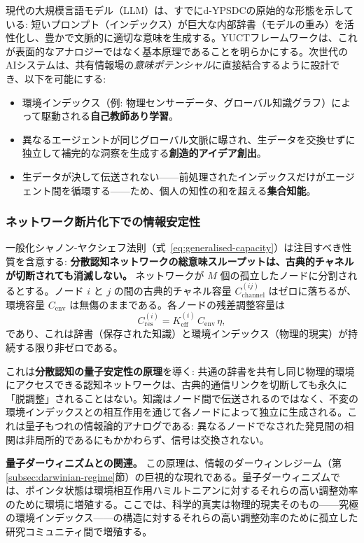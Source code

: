 \documentclass[12pt,a4paper]{article}
\theoremstyle{definition}
\theoremstyle{remark}
\begin{document}
	現代の大規模言語モデル（LLM）は、すでにd-YPSDCの原始的な形態を示している: 短いプロンプト（インデックス）が巨大な内部辞書（モデルの重み）を活性化し、豊かで文脈的に適切な意味を生成する。YUCTフレームワークは、これが表面的なアナロジーではなく基本原理であることを明らかにする。次世代のAIシステムは、共有情報場の\emph{意味ポテンシャル}に直接結合するように設計でき、以下を可能にする:
	\begin{itemize}
		\item 環境インデックス（例: 物理センサーデータ、グローバル知識グラフ）によって駆動される\textbf{自己教師あり学習}。
		\item 異なるエージェントが同じグローバル文脈に曝され、生データを交換せずに独立して補完的な洞察を生成する\textbf{創造的アイデア創出}。
		\item 生データが決して伝送されない——前処理されたインデックスだけがエージェント間を循環する——ため、個人の知性の和を超える\textbf{集合知能}。
	\end{itemize}
	
	\subsubsection{ネットワーク断片化下での情報安定性}
	\label{subsubsec:info-stability-fragmentation}
	
	一般化シャノン-ヤクシェフ法則（式~\ref{eq:generalised-capacity}）は注目すべき性質を含意する: \textbf{分散認知ネットワークの総意味スループットは、古典的チャネルが切断されても消滅しない。} ネットワークが $M$ 個の孤立したノードに分割されるとする。ノード $i$ と $j$ の間の古典的チャネル容量 $C_{\mathrm{channel}}^{(ij)}$ はゼロに落ちるが、環境容量 $C_{\mathrm{env}}$ は無傷のままである。各ノードの残差調整容量は
	\[
	C_{\mathrm{res}}^{(i)} = K_{\mathrm{eff}}^{(i)} \, C_{\mathrm{env}} \, \eta,
	\]
	であり、これは辞書（保存された知識）と環境インデックス（物理的現実）が持続する限り非ゼロである。
	
	これは\textbf{分散認知の量子安定性の原理}を導く: 共通の辞書を共有し同じ物理的環境にアクセスできる認知ネットワークは、古典的通信リンクを切断しても永久に「脱調整」されることはない。知識はノード間で伝送されるのではなく、不変の環境インデックスとの相互作用を通じて各ノードによって独立に生成される。これは量子もつれの情報論的アナログである: 異なるノードでなされた発見間の相関は非局所的であるにもかかわらず、信号は交換されない。
	
	\textbf{量子ダーウィニズムとの関連。}
	この原理は、情報のダーウィンレジーム（第\ref{subsec:darwinian-regime}節）の巨視的な現れである。量子ダーウィニズムでは、ポインタ状態は環境相互作用ハミルトニアンに対するそれらの高い調整効率のために環境に増殖する。ここでは、科学的真実は物理的現実そのもの——究極の環境インデックス——の構造に対するそれらの高い調整効率のために孤立した研究コミュニティ間で増殖する。
	
\end{document}
